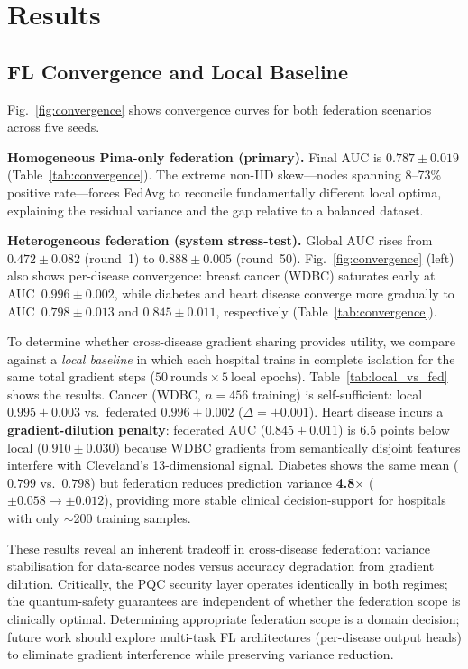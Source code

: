 \documentclass[conference]{IEEEtran}
\begin{document}
\section{Results}
\label{sec:results}

\subsection{FL Convergence and Local Baseline}

Fig.~\ref{fig:convergence} shows convergence curves for both
federation scenarios across five seeds.

\textbf{Homogeneous Pima-only federation (primary).}
Final AUC is $0.787 \pm 0.019$ (Table~\ref{tab:convergence}).
The extreme non-IID skew---nodes spanning 8--73\% positive
rate---forces FedAvg to reconcile fundamentally different local
optima, explaining the residual variance and the gap relative to
a balanced dataset.

\textbf{Heterogeneous federation (system stress-test).}
Global AUC rises from $0.472 \pm 0.082$ (round~1) to
$\mathbf{0.888 \pm 0.005}$ (round~50).
Fig.~\ref{fig:convergence} (left) also shows per-disease convergence:
breast cancer (WDBC) saturates early at AUC~$0.996 \pm 0.002$,
while diabetes and heart disease converge more gradually to
AUC~$0.798 \pm 0.013$ and $0.845 \pm 0.011$, respectively
(Table~\ref{tab:convergence}).

To determine whether cross-disease gradient sharing provides utility,
we compare against a \emph{local baseline} in which each hospital
trains in complete isolation for the same total gradient steps
($50~\text{rounds} \times 5~\text{local epochs}$).
Table~\ref{tab:local_vs_fed} shows the results.
Cancer (WDBC, $n{=}456$ training) is self-sufficient: local
$0.995 \pm 0.003$ vs.\ federated $0.996 \pm 0.002$
($\Delta = +0.001$).
Heart disease incurs a \textbf{gradient-dilution penalty}: federated
AUC ($0.845 \pm 0.011$) is 6.5 points below local ($0.910 \pm 0.030$)
because WDBC gradients from semantically disjoint features interfere
with Cleveland's 13-dimensional signal.
Diabetes shows the same mean ($0.799$ vs.\ $0.798$) but federation
reduces prediction variance \textbf{4.8$\times$}
($\pm0.058 \to \pm0.012$), providing more stable clinical
decision-support for hospitals with only $\sim$200 training samples.

These results reveal an inherent tradeoff in cross-disease
federation: variance stabilisation for data-scarce nodes versus
accuracy degradation from gradient dilution.
Critically, the PQC security layer operates identically in both
regimes; the quantum-safety guarantees are independent of whether
the federation scope is clinically optimal.
Determining appropriate federation scope is a domain decision;
future work should explore multi-task FL architectures (per-disease
output heads) to eliminate gradient interference while preserving
variance reduction.
\end{document}
